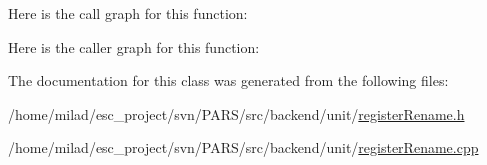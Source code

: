 Here is the call graph for this function:




Here is the caller graph for this function:




The documentation for this class was generated from the following files:\begin{DoxyCompactItemize}
\item 
/home/milad/esc\_\-project/svn/PARS/src/backend/unit/\hyperlink{backend_2unit_2registerRename_8h}{registerRename.h}\item 
/home/milad/esc\_\-project/svn/PARS/src/backend/unit/\hyperlink{backend_2unit_2registerRename_8cpp}{registerRename.cpp}\end{DoxyCompactItemize}
